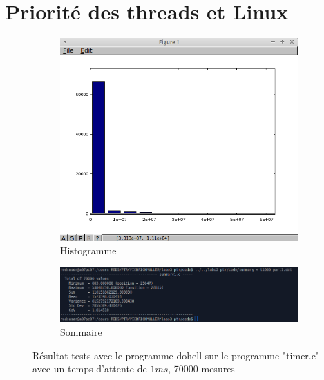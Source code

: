 \section{Priorité des threads et Linux}

\par
\begin{figure}[H]
\begin{subfigure}{.5\textwidth}
  \centering
  \includegraphics[width=.9\linewidth]{./img/part1_octave.png}
  \caption*{Histogramme}

\end{subfigure}%
\begin{subfigure}{.5\textwidth}
  \centering
  \includegraphics[width=.9\linewidth]{./img/part1_summary.png}
  \caption*{Sommaire}

\end{subfigure}
\caption{Résultat tests avec le programme dohell sur le programme "timer.c" avec un temps d'attente de $1ms$, 70000 mesures }

\end{figure}
